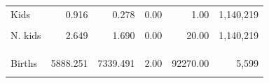 \begin{table}[htbp]
\begin{tabular}{l*{5}{D{.}{.}{-1}}}
Kids &     0.916&     0.278&      0.00&      1.00&       1,140,219\\\\
N. kids &     2.649&     1.690&      0.00&     20.00&       1,140,219\\\\
\addlinespace
{} \\\\
Births &  5888.251&  7339.491&      2.00&  92270.00&           5,599\\\\
\bottomrule
\end{tabular}
\end{table}
